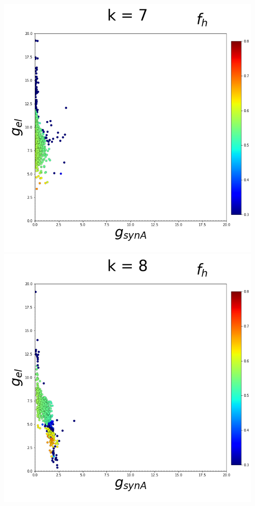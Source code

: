 \documentclass[11pt]{article}
\begin{document}
\begin{center}
\includegraphics[scale=0.125]{DSN_figs/STGCircuit_DSN_c=2_rs=3_k=7.png}
\includegraphics[scale=0.125]{DSN_figs/STGCircuit_DSN_c=2_rs=3_k=8.png}

\end{center}
\end{document}
